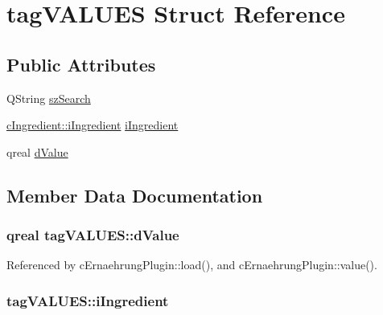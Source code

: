 \hypertarget{structtag_v_a_l_u_e_s}{}\section{tag\+V\+A\+L\+U\+ES Struct Reference}
\label{structtag_v_a_l_u_e_s}
\subsection*{Public Attributes}
\begin{DoxyCompactItemize}
\item 
Q\+String \hyperlink{structtag_v_a_l_u_e_s_a1af4ef8b1eb53303b473be2e9dfe4cdf}{sz\+Search}
\item 
\hyperlink{classc_ingredient_acf023723841ec66cd6368a25e3174a28}{c\+Ingredient\+::i\+Ingredient} \hyperlink{structtag_v_a_l_u_e_s_a7ff96fb996a57c44a72cd72be967064e}{i\+Ingredient}
\item 
qreal \hyperlink{structtag_v_a_l_u_e_s_a725904e5427d2d89fc28bac836ebe270}{d\+Value}
\end{DoxyCompactItemize}


\subsection{Member Data Documentation}
\subsubsection[{\texorpdfstring{d\+Value}{dValue}}]{\setlength{\rightskip}{0pt plus 5cm}qreal tag\+V\+A\+L\+U\+E\+S\+::d\+Value}\hypertarget{structtag_v_a_l_u_e_s_a725904e5427d2d89fc28bac836ebe270}{}\label{structtag_v_a_l_u_e_s_a725904e5427d2d89fc28bac836ebe270}


Referenced by c\+Ernaehrung\+Plugin\+::load(), and c\+Ernaehrung\+Plugin\+::value().

\subsubsection[{\texorpdfstring{i\+Ingredient}{iIngredient}}]{ tag\+V\+A\+L\+U\+E\+S\+::i\+Ingredient}\hypertarget{structtag_v_a_l_u_e_s_a7ff96fb996a57c44a72cd72be967064e}{}\label{structtag_v_a_l_u_e_s_a7ff96fb996a57c44a72cd72be967064e}


